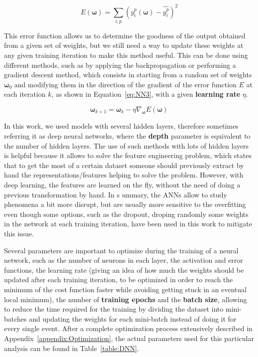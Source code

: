 \documentclass[a4paper, 10pt, openright]{report}
\begin{document}
\begin{equation}
\label{eq:NN2}
E(\bm \omega) = \sum_{i, p} \left (y_i^p(\bm \omega) - \hat{y_i^p} \right)^2
\end{equation}

This error function allows us to determine the goodness of the output obtained from a given set of weights, but we still need a way to update these weights at any given training iteration to make this method useful. This can be done using different methods, such as by applying the backpropagation or performing a gradient descent method, which consists in starting from a random set of weights $\bm \omega_0$ and modifying them in the direction of the gradient of the error function $E$ at each iteration $k$, as shown in Equation~\ref{eq:NN3}, with a given \textbf{learning rate} $\eta$.

\begin{equation}
\label{eq:NN3}
\bm \omega_{k+1} = \bm \omega_k - \eta \nabla_{\bm \omega} E(\bm \omega)
\end{equation}

In this work, we used models with several hidden layers, therefore sometimes referring it as deep neural networks, where the \textbf{depth} parameter is equivalent to the number of hidden layers. The use of such methods with lots of hidden layers is helpful because it allows to solve the feature engineering problem, which states that to get the most of a certain dataset someone should previously extract by hand the representations/features helping to solve the problem. However, with deep learning, the features are learned on the fly, without the need of doing a previous transformation by hand. In s ummary, the \acp{ANN} allow to study phenomena a bit more disrupt, but are usually more sensitive to the overfitting even though some options, such as the dropout, droping randomly some weights in the network at each training iteration, have been used in this work to mitigate this issue. 

Several parameters are important to optimize during the training of a neural network, such as the number of neurons in each layer, the activation and error functions, the learning rate (giving an idea of how much the weights should be updated after each training iteration, to be optimized in order to reach the minimum of the cost function faster while avoiding getting stuck in an eventual local minimum), the number of \textbf{training epochs} and the \textbf{batch size}, allowing to reduce the time required for the training by dividing the dataset into mini-batches and updating the weights for each mini-batch instead of doing it for every single event. After a complete optimization process extensively described in Appendix~\ref{appendix:Optimization}, the actual parameters used for this particular analysis can be found in Table~\ref{table:DNN}.
\end{document}
